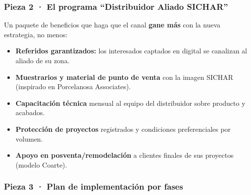 \documentclass[11pt,a4paper]{article}
\begin{document}

\hypertarget{pieza-2-el-programa-distribuidor-aliado-sichar}{%
\subsubsection*{Pieza 2 · El programa ``Distribuidor Aliado
SICHAR''}\label{pieza-2-el-programa-distribuidor-aliado-sichar}}

Un paquete de beneficios que haga que el canal \textbf{gane más} con la nueva estrategia, no menos:

\begin{itemize}
\item
  \textbf{Referidos garantizados:} los interesados captados en digital se canalizan al aliado de su
  zona.
\item
  \textbf{Muestrarios y material de punto de venta} con la imagen SICHAR (inspirado en Porcelanosa
  Associates).
\item
  \textbf{Capacitación técnica} mensual al equipo del distribuidor sobre producto y acabados.
\item
  \textbf{Protección de proyectos} registrados y condiciones preferenciales por volumen.
\item
  \textbf{Apoyo en posventa/remodelación} a clientes finales de sus proyectos (modelo Coarte).
\end{itemize}


\hypertarget{pieza-3-plan-de-implementaciuxf3n-por-fases}{%
\subsubsection*{Pieza 3 · Plan de implementación por
fases}\label{pieza-3-plan-de-implementaciuxf3n-por-fases}}
\end{document}

